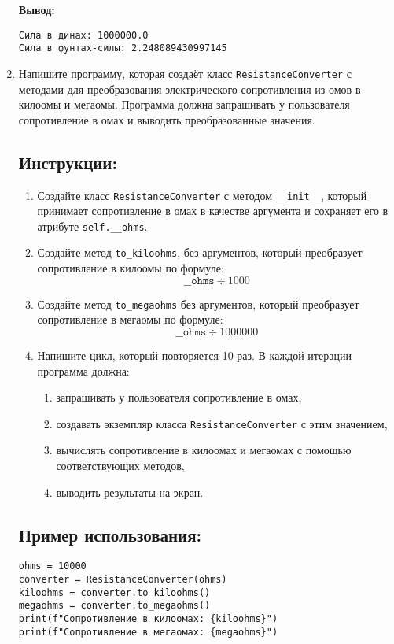 \begin{enumerate}
\textbf{Вывод:}
\begin{verbatim}
Сила в динах: 1000000.0
Сила в фунтах-силы: 2.248089430997145
\end{verbatim}

\item

Напишите программу, которая создаёт класс \texttt{ResistanceConverter} с методами для преобразования электрического сопротивления
из омов в килоомы и мегаомы. Программа должна запрашивать у пользователя сопротивление в омах
и выводить преобразованные значения.

\subsection*{Инструкции:}
\begin{enumerate}
\item Создайте класс \texttt{ResistanceConverter} с методом
\texttt{\_\_init\_\_}, который принимает сопротивление в омах в
качестве аргумента и сохраняет его в атрибуте \texttt{self.\_\_ohms}.

\item Создайте метод \texttt{to\_kiloohms},
без аргументов, который преобразует сопротивление в килоомы по формуле:
\[
\texttt{\_\_ohms} \div 1000
\]

\item Создайте метод \texttt{to\_megaohms} без аргументов,
который преобразует сопротивление в мегаомы по формуле:
\[
\texttt{\_\_ohms} \div 1000000
\]

\item Напишите цикл, который повторяется 10 раз. В каждой итерации программа должна:
\begin{enumerate}
\item запрашивать у пользователя сопротивление в омах,
\item создавать экземпляр класса \texttt{ResistanceConverter} с этим значением,
\item вычислять сопротивление в килоомах и мегаомах с помощью соответствующих методов,
\item выводить результаты на экран.
\end{enumerate}
\end{enumerate}

\subsection*{Пример использования:}
\begin{verbatim}
ohms = 10000
converter = ResistanceConverter(ohms)
kiloohms = converter.to_kiloohms()
megaohms = converter.to_megaohms()
print(f"Сопротивление в килоомах: {kiloohms}")
print(f"Сопротивление в мегаомах: {megaohms}")
\end{verbatim}


\end{enumerate}
